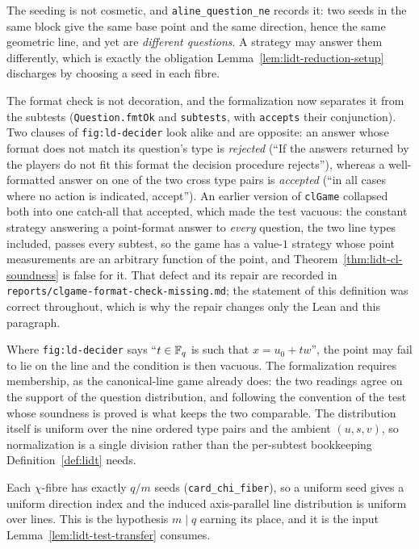 The seeding is not cosmetic, and \texttt{aline\_question\_ne} records it: two seeds in the same
block give the same base point and the same direction, hence the same geometric line, and yet
are \emph{different questions}. A strategy may answer them differently, which is exactly the
obligation Lemma~\ref{lem:lidt-reduction-setup} discharges by choosing a seed in each fibre.

The format check is not decoration, and the formalization now separates it from the subtests
(\texttt{Question.fmtOk} and \texttt{subtests}, with \texttt{accepts} their conjunction). Two
clauses of \texttt{fig:ld-decider} look alike and are opposite: an answer whose format does not
match its question's type is \emph{rejected} (``If the answers returned by the players do not
fit this format the decision procedure rejects''), whereas a well-formatted answer on one of
the two cross type pairs is \emph{accepted} (``in all cases where no action is indicated,
accept''). An earlier version of \texttt{clGame} collapsed both into one catch-all that
accepted, which made the test vacuous: the constant strategy answering a point-format answer to
\emph{every} question, the two line types included, passes every subtest, so the game has a
value-$1$ strategy whose point measurements are an arbitrary function of the point, and
Theorem~\ref{thm:lidt-cl-soundness} is false for it. That defect and its repair are recorded in
\texttt{reports/clgame-format-check-missing.md}; the statement of this definition was correct
throughout, which is why the repair changes only the Lean and this paragraph.

Where \texttt{fig:ld-decider} says ``$t \in \mathbb{F}_q$ is such that $x = u_0 + tw$'', the point may
fail to lie on the line and the condition is then vacuous. The formalization requires
membership, as the canonical-line game already does: the two readings agree on the support of
the question distribution, and following the convention of the test whose soundness is proved
is what keeps the two comparable. The distribution itself is uniform over the nine ordered type
pairs and the ambient $(u, s, v)$, so normalization is a single division rather than the
per-subtest bookkeeping Definition~\ref{def:lidt} needs.

Each $\chi$-fibre has exactly $q/m$ seeds (\texttt{card\_chi\_fiber}), so a uniform seed gives
a uniform direction index and the induced axis-parallel line distribution is uniform over
lines. This is the hypothesis $m \mid q$ earning its place, and it is the input
Lemma~\ref{lem:lidt-test-transfer} consumes.

